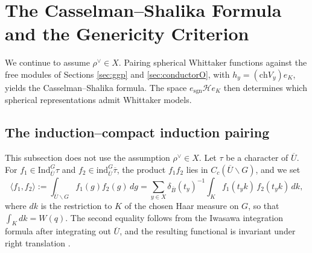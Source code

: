 \documentclass[12pt]{article}
\numberwithin{equation}{section}
\theoremstyle{definition}
\theoremstyle{remark}
\theoremstyle{plain}
\begin{document}
\section[The Casselman--Shalika Formula and the Genericity Criterion]{\fontsize{15}{18}\selectfont The Casselman--Shalika Formula and the Genericity Criterion}\label{sec:cs}

We continue to assume $\rho^\vee \in X$. Pairing spherical Whittaker functions against the free modules of Sections \ref{sec:ggp} and \ref{sec:conductorO}, with $h_y = (\mathrm{ch}V_y)e_K$, yields the Casselman--Shalika formula. The space $e_{\mathrm{sgn}}\mathcal{H}e_K$ then determines which spherical representations admit Whittaker models.

\subsection{The induction--compact induction pairing}

This subsection does not use the assumption $\rho^\vee \in X$. Let $\tau$ be a character of $\overline{U}$. For $f_1 \in \mathrm{Ind}_{\overline{U}}^G \tau$ and $f_2 \in \mathrm{ind}_{\overline{U}}^G \overline{\tau}$, the product $f_1 f_2$ lies in $C_c(\overline{U}\backslash G)$, and we set
\begin{equation}\label{eq:pairing_def}
\langle f_1, f_2 \rangle := \int_{\overline{U}\backslash G} f_1(g) f_2(g)\, dg = \sum_{y \in X} \delta_{\overline{B}}(t_y)^{-1} \int_K f_1(t_y k)\, f_2(t_y k)\, dk,
\end{equation}
where $dk$ is the restriction to $K$ of the chosen Haar measure on $G$, so that $\int_K dk = W(q)$. The second equality follows from the Iwasawa integration formula after integrating out $\overline U$, and the resulting functional is invariant under right translation \cite[Section IV.1]{Ca}.
\end{document}
